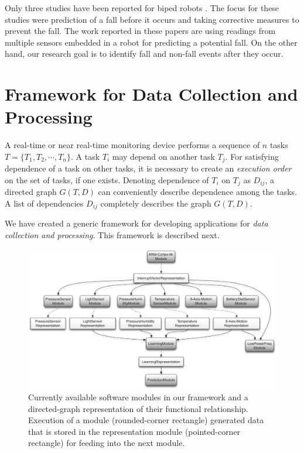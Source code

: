 \documentclass[]{IEEEtran}
\begin{document}
\par Only three studies have been reported for biped robots
\cite{Andre2015,Goswami2014,Moya2015}. The focus for these studies
were prediction of a fall before it occurs and taking corrective measures to
prevent the fall. The work reported in these papers are using readings from
multiple sensors embedded in a robot for predicting a potential fall. On the
other hand, our research goal is to identify  fall and non-fall events  after
they occur.

\section{Framework for Data Collection and Processing}
\label{sec:framework}

A real-time or near real-time monitoring device performs a sequence of $n$
tasks $T = \{ T_1, T_2,\cdots,T_n\}$. A task $T_i$ may depend on another task
$T_j$.  For satisfying dependence of a task on other tasks, it is necessary to
create an \emph{execution order} on the set of tasks, if one exists. Denoting
dependence of $T_i$ on $T_j$ as $D_{ij}$, a directed graph $G(T,D)$ can
conveniently describe dependence among the tasks. A list of dependencies
$D_{ij}$ completely describes the graph $G(T,D)$.  \par We have created a
generic framework for developing applications for \emph{data collection and
processing}. This framework is described next.

\begin{figure}[!t]
\centering
\includegraphics[width=.75\textwidth]{figures/graph_structure_def-crop3_bw.eps}
\caption{Currently available software modules in our framework and a directed-graph representation
of their functional relationship. Execution of a module (rounded-corner rectangle) generated data
that is stored in the representation module (pointed-corner rectangle) for feeding into the next
module.} \label{fig:framework}
\end{figure}
\end{document}
